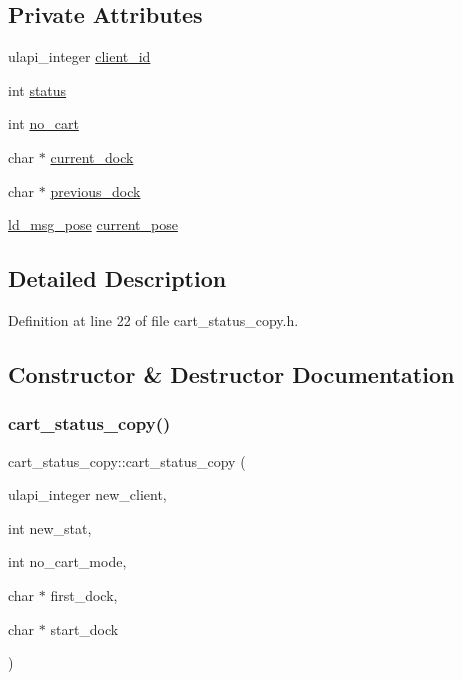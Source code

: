 \subsection*{Private Attributes}
\begin{DoxyCompactItemize}
\item 
ulapi\+\_\+integer \mbox{\hyperlink{classcart__status__copy_a8d8dca2a4a0c35f4676fc7d68254ca05}{client\+\_\+id}}
\item 
int \mbox{\hyperlink{classcart__status__copy_a00f9d96ff04b8975c69a263ff15708ec}{status}}
\item 
int \mbox{\hyperlink{classcart__status__copy_a33596a12e74edf48fb8c8d1ba03d98dd}{no\+\_\+cart}}
\item 
char $\ast$ \mbox{\hyperlink{classcart__status__copy_a771289ffece9eb29e21a9deba5522888}{current\+\_\+dock}}
\item 
char $\ast$ \mbox{\hyperlink{classcart__status__copy_a77d6208ab0579618165d77e56a6b8f01}{previous\+\_\+dock}}
\item 
\mbox{\hyperlink{structld__msg__pose}{ld\+\_\+msg\+\_\+pose}} \mbox{\hyperlink{classcart__status__copy_a0a127fed372d7db77bc202bcc3e15d76}{current\+\_\+pose}}
\end{DoxyCompactItemize}


\subsection{Detailed Description}


Definition at line 22 of file cart\+\_\+status\+\_\+copy.\+h.



\subsection{Constructor \& Destructor Documentation}
\mbox{\label{classcart__status__copy_a20571920a3d289d2323ad3e34b2b5384}} 
\subsubsection{\texorpdfstring{cart\+\_\+status\+\_\+copy()}{cart\_status\_copy()}\hspace{0.1cm}{\footnotesize\ttfamily [1/2]}}
{\footnotesize\ttfamily cart\+\_\+status\+\_\+copy\+::cart\+\_\+status\+\_\+copy (\begin{DoxyParamCaption}\item[{ulapi\+\_\+integer}]{new\+\_\+client,  }\item[{int}]{new\+\_\+stat,  }\item[{int}]{no\+\_\+cart\+\_\+mode,  }\item[{char $\ast$}]{first\+\_\+dock,  }\item[{char $\ast$}]{start\+\_\+dock }\end{DoxyParamCaption})}

